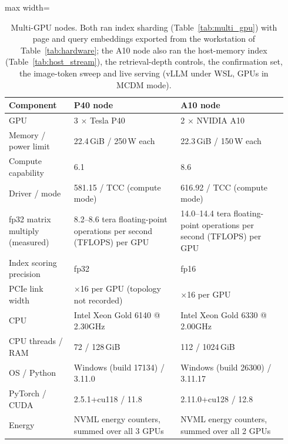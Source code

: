 \begin{table}[t]
\centering
\caption{Multi-GPU nodes. Both ran index sharding (Table~\ref{tab:multi_gpu}) with page and query embeddings exported from the workstation of Table~\ref{tab:hardware}; the A10 node also ran the host-memory index (Table~\ref{tab:host_stream}), the retrieval-depth controls, the confirmation set, the image-token sweep and live serving (vLLM under WSL, GPUs in MCDM mode).}
\label{tab:hardware_multigpu}
\begin{adjustbox}{max width=\linewidth}
\begin{tabular}{p{0.22\linewidth}p{0.36\linewidth}p{0.36\linewidth}}
\toprule
\textbf{Component} & \textbf{P40 node} & \textbf{A10 node} \\
\midrule
GPU & 3 $\times$ Tesla P40 & 2 $\times$ NVIDIA A10 \\
Memory / power limit & 22.4\,GiB / 250\,W each & 22.3\,GiB / 150\,W each \\
Compute capability & 6.1 & 8.6 \\
Driver / mode & 581.15 / TCC (compute mode) & 616.92 / TCC (compute mode) \\
fp32 matrix multiply (measured) & 8.2--8.6 tera floating-point operations per second (TFLOPS) per GPU & 14.0--14.4 tera floating-point operations per second (TFLOPS) per GPU \\
Index scoring precision & fp32 & fp16 \\
PCIe link width & $\times$16 per GPU (topology not recorded) & $\times$16 per GPU \\
CPU & Intel Xeon Gold 6140 @ 2.30GHz & Intel Xeon Gold 6330 @ 2.00GHz \\
CPU threads / RAM & 72 / 128\,GiB & 112 / 1024\,GiB \\
OS / Python & Windows (build 17134) / 3.11.0 & Windows (build 26300) / 3.11.17 \\
PyTorch / CUDA & 2.5.1+cu118 / 11.8 & 2.11.0+cu128 / 12.8 \\
Energy & NVML energy counters, summed over all 3 GPUs & NVML energy counters, summed over all 2 GPUs \\
\bottomrule
\end{tabular}
\end{adjustbox}
\end{table}
